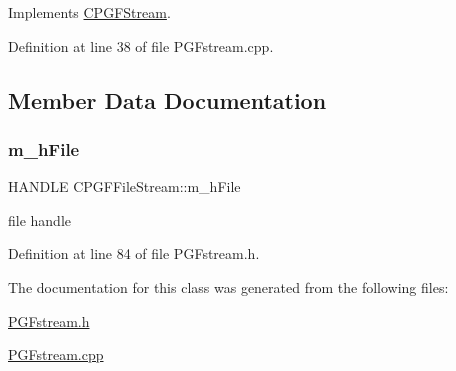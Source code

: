 Implements \mbox{\hyperlink{classCPGFStream_a0a46ae977995134787219288f4123134}{C\+P\+G\+F\+Stream}}.



Definition at line 38 of file P\+G\+Fstream.\+cpp.


\begin{DoxyCode}{0}

\end{DoxyCode}


\subsection{Member Data Documentation}
\mbox{\label{classCPGFFileStream_a3e442cbf8c1a8f66d737c36ceb0c9f32}} 
\subsubsection{\texorpdfstring{m\_hFile}{m\_hFile}}
{\footnotesize\ttfamily H\+A\+N\+D\+LE C\+P\+G\+F\+File\+Stream\+::m\+\_\+h\+File\hspace{0.3cm}{\ttfamily [protected]}}



file handle 



Definition at line 84 of file P\+G\+Fstream.\+h.



The documentation for this class was generated from the following files\+:\begin{DoxyCompactItemize}
\item 
\mbox{\hyperlink{PGFstream_8h}{P\+G\+Fstream.\+h}}\item 
\mbox{\hyperlink{PGFstream_8cpp}{P\+G\+Fstream.\+cpp}}\end{DoxyCompactItemize}
